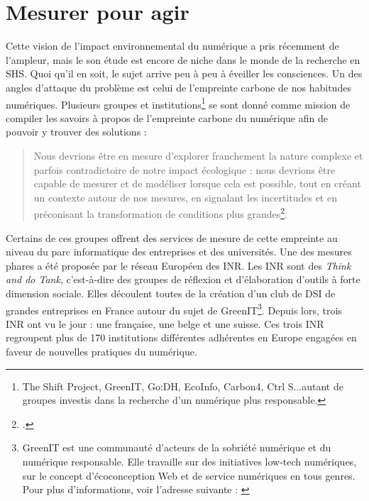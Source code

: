 \documentclass[a4paper,12pt,twoside]{book}
\begin{document}
\section{Mesurer pour agir}
Cette vision de l'impact environnemental du numérique a pris récemment de l'ampleur, mais le son étude est encore de niche dans le monde de la recherche en SHS. Quoi qu'il en soit, le sujet arrive peu à peu à éveiller les consciences. Un des angles d'attaque du problème est celui de l'empreinte carbone de nos habitudes numériques. Plusieurs groupes et institutions\footnote{The Shift Project, GreenIT, Go:DH, EcoInfo, Carbon4, Ctrl S...autant de groupes investis dans la recherche d'un numérique plus responsable.} se sont donné comme mission de compiler les savoirs à propos de l'empreinte carbone du numérique afin de pouvoir y trouver des solutions :
\begin{quote}
    Nous devrions être en mesure d'explorer franchement la nature complexe et parfois contradictoire de notre impact écologique : nous devrions être capable de mesurer et de modéliser lorsque cela est possible, tout en créant un contexte autour de nos mesures, en signalant les incertitudes et en préconisant la transformation de conditions plus grandes\footcite{DHCC}.
\end{quote}
Certains de ces groupes offrent des services de mesure de cette empreinte au niveau du parc informatique des entreprises et des universités. Une des mesures phares a été proposée par le réseau Européen des \acrfull{INR}. Les \acrshort{INR} sont des \textit{Think and do Tank}, c'est-à-dire des groupes de réflexion et d'élaboration d'outils à forte dimension sociale. Elles découlent toutes de la création d'un club de DSI de grandes entreprises en France autour du sujet de GreenIT\footnote{GreenIT est une communauté d'acteurs de la sobriété numérique et du numérique responsable. Elle travaille sur des initiatives low-tech numériques, sur le concept d'écoconception Web et de service numériques en tous genres. Pour plus d'informations, voir l'adresse suivante : \cite{greenit}}. Depuis lors, trois INR ont vu le jour : une française, une belge et une suisse. Ces trois \acrshort{INR} regroupent plus de 170 institutions différentes adhérentes en Europe engagées en faveur de nouvelles pratiques du numérique.
\end{document}
